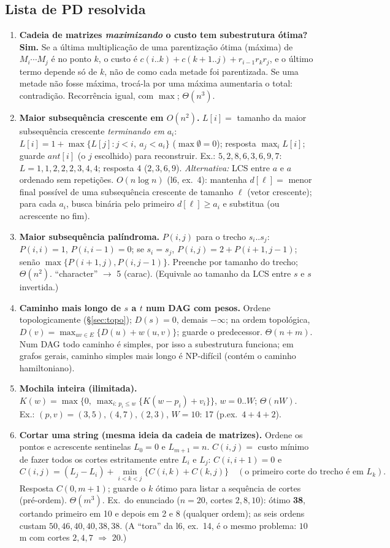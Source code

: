 \subsection{Lista de PD resolvida}\label{sec:listapd}
\begin{enumerate}
  \item \textbf{Cadeia de matrizes \emph{maximizando} o custo tem subestrutura ótima?} \textbf{Sim.} Se a última multiplicação de uma parentização ótima (máxima) de $M_i\cdots M_j$ é no ponto $k$, o custo é $c(i..k)+c(k+1..j)+r_{i-1}r_kr_j$, e o último termo depende só de $k$, não de como cada metade foi parentizada. Se uma metade não fosse máxima, trocá-la por uma máxima aumentaria o total: contradição. Recorrência igual, com $\max$; $\Theta(n^3)$.
  \item \textbf{Maior subsequência crescente em $O(n^2)$.} $L[i]=$ tamanho da maior subsequência crescente \emph{terminando em} $a_i$: $L[i]=1+\max\{L[j]: j<i,\ a_j<a_i\}$ ($\max\emptyset=0$); resposta $\max_iL[i]$; guarde $ant[i]$ (o $j$ escolhido) para reconstruir. Ex.: $5,2,8,6,3,6,9,7$: $L=1,1,2,2,2,3,4,4$; resposta 4 ($2,3,6,9$). \emph{Alternativa:} LCS entre $a$ e $a$ ordenado sem repetições. \emph{$O(n\log n)$} (l6, ex.~4): mantenha $d[\ell]=$ menor final possível de uma subsequência crescente de tamanho $\ell$ (vetor crescente); para cada $a_i$, busca binária pelo primeiro $d[\ell]\ge a_i$ e substitua (ou acrescente no fim).
  \item \textbf{Maior subsequência palíndroma.} $P(i,j)$ para o trecho $s_i..s_j$: $P(i,i)=1$, $P(i,i-1)=0$; se $s_i=s_j$, $P(i,j)=2+P(i+1,j-1)$; senão $\max\{P(i+1,j),P(i,j-1)\}$. Preenche por tamanho do trecho; $\Theta(n^2)$. ``character'' $\to$ 5 (\textrm{carac}). (Equivale ao tamanho da LCS entre $s$ e $s$ invertida.)
  \item \textbf{Caminho mais longo de $s$ a $t$ num DAG com pesos.} Ordene topologicamente (§\ref{sec:topo}); $D(s)=0$, demais $-\infty$; na ordem topológica, $D(v)=\max_{uv\in E}\{D(u)+w(u,v)\}$; guarde o predecessor. $\Theta(n+m)$. Num DAG todo caminho é simples, por isso a subestrutura funciona; em grafos gerais, caminho simples mais longo é NP-difícil (contém o caminho hamiltoniano).
  \item \textbf{Mochila inteira (ilimitada).} $K(w)=\max\big\{0,\ \max_{i:\,p_i\le w}\{K(w-p_i)+v_i\}\big\}$, $w=0..W$; $\Theta(nW)$. Ex.: $(p,v)=(3,5),(4,7),(2,3)$, $W=10$: 17 (p.ex.\ $4+4+2$).
  \item \textbf{Cortar uma string (mesma ideia da cadeia de matrizes).} Ordene os pontos e acrescente sentinelas $L_0=0$ e $L_{m+1}=n$. $C(i,j)=$ custo mínimo de fazer todos os cortes estritamente entre $L_i$ e $L_j$: $C(i,i+1)=0$ e
  \[C(i,j)=(L_j-L_i)+\min_{i<k<j}\{C(i,k)+C(k,j)\}\quad(\text{o primeiro corte do trecho é em }L_k).\]
  Resposta $C(0,m+1)$; guarde o $k$ ótimo para listar a sequência de cortes (pré-ordem). $\Theta(m^3)$. Ex.\ do enunciado ($n=20$, cortes $2,8,10$): ótimo \textbf{38}, cortando primeiro em 10 e depois em 2 e 8 (qualquer ordem); as seis ordens custam $50,46,40,40,38,38$. (A ``tora'' da l6, ex.~14, é o mesmo problema: $10$ m com cortes $2,4,7$ $\Rightarrow$ 20.)
\end{enumerate}

